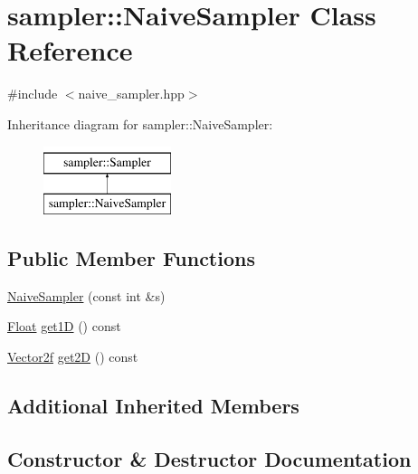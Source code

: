 \hypertarget{classsampler_1_1NaiveSampler}{}\section{sampler\+::Naive\+Sampler Class Reference}
\label{classsampler_1_1NaiveSampler}


{\ttfamily \#include $<$naive\+\_\+sampler.\+hpp$>$}

Inheritance diagram for sampler\+::Naive\+Sampler\+:\begin{figure}[H]
\begin{center}
\leavevmode
\includegraphics[height=2.000000cm]{classsampler_1_1NaiveSampler}
\end{center}
\end{figure}
\subsection*{Public Member Functions}
\begin{DoxyCompactItemize}
\item 
\mbox{\hyperlink{classsampler_1_1NaiveSampler_ab5c9074d8c18c01e65435f04843f834d}{Naive\+Sampler}} (const int \&s)
\item 
\mbox{\hyperlink{cyclop_8hpp_a07afd7094cb489cbd514c76e6f55d34f}{Float}} \mbox{\hyperlink{classsampler_1_1NaiveSampler_ad1d445bae1088385deaa5ec05ce7e46a}{get1D}} () const
\item 
\mbox{\hyperlink{cyclop_8hpp_a0c5eff6545fe0b71d0592c88d930b697}{Vector2f}} \mbox{\hyperlink{classsampler_1_1NaiveSampler_a77655f0c205ae4680e58744850746f06}{get2D}} () const
\end{DoxyCompactItemize}
\subsection*{Additional Inherited Members}


\subsection{Constructor \& Destructor Documentation}
\mbox{\label{classsampler_1_1NaiveSampler_ab5c9074d8c18c01e65435f04843f834d}} 
